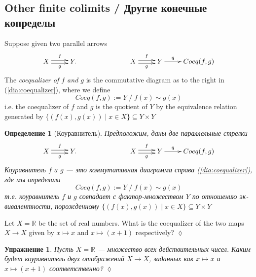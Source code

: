 \documentclass[a4paper]{book}
\def\RR{{\mathbb R}}
\def\to{\rightarrow}
\def\ss{\subseteq}
\def\|{{\;|\;}}
\theoremstyle{myth}
\newtheorem{excENG}[envENG]{\begin{english}Exercise\end{english}}
\newtheorem{definitionENG}[envENG]{\begin{english}Definition\end{english}}
\newenvironment{exerciseENG}{\begin{excENG}}{\hspace*{\fill}$\lozenge$\end{excENG}}
\newtheorem{excRUS}[envRUS]{Упражнение}
\newtheorem{definitionRUS}[envRUS]{Определение}
\newenvironment{exerciseRUS}{\begin{excRUS}}{\hspace*{\fill}$\lozenge$\end{excRUS}}
\begin{document}
\begin{russian}

\subsection{Other finite colimits / Другие конечные копределы}

\begin{definitionENG}[Coequalizer]\label{def:coequalizer}
Suppose given two parallel arrows 
\begin{align}\label{dia:coequalizer}
\xymatrix{X\ar@<.5ex>[r]^f\ar@<-.5ex>[r]_g&Y.}\hspace{1in}\xymatrix{X\ar@<.5ex>[r]^f\ar@<-.5ex>[r]_g&Y\ar[r]^-q&Coeq(f,g)}
\end{align}
The {\em coequalizer of $f$ and $g$} is the commutative diagram as to the right in (\ref{dia:coequalizer}), where we define $$Coeq(f,g):=Y\;/\;f(x)\sim g(x)$$ i.e. the coequalizer of $f$ and $g$ is the quotient of $Y$ by the equivalence relation generated by $\{(f(x),g(x))\|x\in X\}\ss Y\times Y$
\end{definitionENG}

\begin{definitionRUS}[Коуравнитель]\label{def:coequalizer}
Предположим, даны две параллельные стрелки 
\begin{align}\label{dia:coequalizer}
\xymatrix{X\ar@<.5ex>[r]^f\ar@<-.5ex>[r]_g&Y.}\hspace{1in}\xymatrix{X\ar@<.5ex>[r]^f\ar@<-.5ex>[r]_g&Y\ar[r]^-q&Coeq(f,g)}
\end{align}
{\em Коуравнитель $f$ и $g$} — это коммутативная диаграмма справа (\ref{dia:coequalizer}), где мы определили $$Coeq(f,g):=Y\;/\;f(x)\sim g(x)$$ т.е. коуравнитель $f$ и $g$ совпадает с фактор-множеством $Y$ по отношению эквивалентности, порожденному $\{(f(x),g(x))\|x\in X\}\ss Y\times Y$
\end{definitionRUS}

\begin{exerciseENG}
Let $X=\RR$ be the set of real numbers. What is the coequalizer of the two maps $X\to X$ given by $x\mapsto x$ and $x\mapsto (x+1)$ respectively?
\end{exerciseENG}

\begin{exerciseRUS}
Пусть $X=\RR$ — множество всех действительных чисел. Каким будет коуравнитель двух отображений $X\to X$, заданных как $x\mapsto x$ и $x\mapsto (x+1)$ соответственно?
\end{exerciseRUS}


\end{russian}
\end{document}
